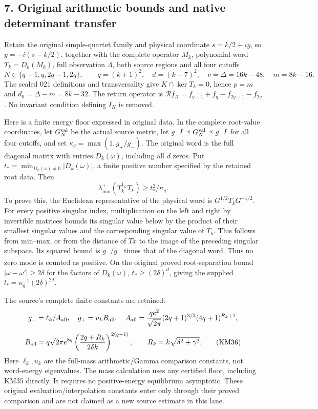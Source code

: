 \documentclass[11pt]{article}
\begin{document}
\subsection{7. Original arithmetic bounds and native determinant transfer}\label{original-arithmetic-bounds-and-native-determinant-transfer}

Retain the original simple-quartet family and physical coordinate \(s=k/2+iy\), so \(y=-i(s-k/2)\), together with the complete operator \(M_k\), polynomial word \(T_k=D_k(M_k)\), full observation \(\Lambda\), both source regions and all four cutoffs \[
 N\in\{q-1,q,2q-1,2q\},\qquad
 q=(k+1)^2,\quad d=(k-7)^2,\quad
 \nu=\Delta=16k-48,\quad m=8k-16.
 \tag{KM34}
\] The sealed 021 definitions and transversality give \(K\cap\ker T_k=0\), hence \(p=m\) and \(d_0=\Delta-m=8k-32\). The return operator is \(\mathcal R f_N=f_{q-1}+f_q-f_{2q-1}-f_{2q}\). No invariant condition defining \(I_K\) is removed.

Here is a finite energy floor expressed in original data. In the complete root-value coordinates, let \(G_N^{\rm val}\) be the actual source metric, let \(g_-I\preceq G_N^{\rm val}\preceq g_+I\) for all four cutoffs, and set \(\kappa_g=\max(1,g_+/g_-)\). The original word is the full diagonal matrix with entries \(D_k(\omega)\), including all \(d\) zeros. Put \(t_*=\min_{D_k(\omega)\ne0}|D_k(\omega)|\), a finite positive number specified by the retained root data. Then \[
 \lambda_{\min}^+(T_k^{\dagger_G}T_k)\ge t_*^2/\kappa_g.
 \tag{KM35}
\] To prove this, the Euclidean representative of the physical word is \(G^{1/2}T_kG^{-1/2}\). For every positive singular index, multiplication on the left and right by invertible matrices bounds its singular value below by the product of their smallest singular values and the corresponding singular value of \(T_k\). This follows from min--max, or from the distance of \(Tx\) to the image of the preceding singular subspace. Its squared bound is \(g_-/g_+\) times that of the diagonal word. Thus no zero mode is counted as positive. On the original proved root-separation bound \(|\omega-\omega'|\ge2\delta\) for the factors of \(D_k(\omega)\), \(t_*\ge(2\delta)^d\), giving the supplied \(l_*=\kappa_g^{-1}(2\delta)^{2d}\).

The source's complete finite constants are retained: \[
 g_-=\ell_k/A_{\rm all},\quad g_+=u_kB_{\rm all},\quad
 A_{\rm all}=\frac{qe^2}{\sqrt{2\pi}}(2q+1)^{3/2}(4q+1)^{R_k+1},
\] \[
 B_{\rm all}=q\sqrt{2\pi}e^{8q}
 \left(\frac{2q+R_k}{2\delta k}\right)^{2(q-1)},\qquad
 R_k=k\sqrt{\delta^2+\gamma^2}.
 \tag{KM36}
\] Here \(\ell_k,u_k\) are the full-mass arithmetic/Gamma comparison constants, not word-energy eigenvalues. The mass calculation uses any certified floor, including KM35 directly. It requires no positive-energy equilibrium asymptotic. These original evaluation/interpolation constants enter only through their proved comparison and are not claimed as a new source estimate in this lane.
\end{document}

